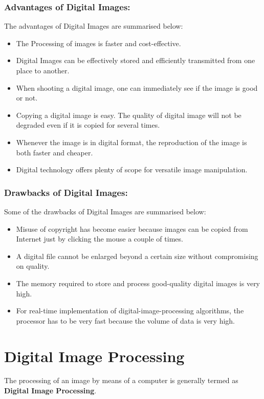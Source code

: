 \subsubsection{Advantages of Digital Images:}
The advantages of Digital Images are summarised below:
\begin{itemize}
    \item The Processing of images is faster and cost-effective.
    \item Digital Images can be effectively stored and efficiently transmitted from one place to another.
    \item When shooting a digital image, one can immediately see if the image is good or not.
    \item Copying a digital image is easy. The quality of digital image will not be degraded even if it is copied for several times.
    \item Whenever the image is in digital format, the reproduction of the image is both faster and cheaper.
    \item Digital technology offers plenty of scope for versatile image manipulation.
\end{itemize}

\subsubsection{Drawbacks of Digital Images:}
Some of the drawbacks of Digital Images are summarised below:
\begin{itemize}
    \item Misuse of copyright has become easier because images can be copied from Internet just by clicking the mouse a couple of times.
    \item A digital file cannot be enlarged beyond a certain size without compromising on quality.
    \item The memory required to store and process good-quality digital images is very high.
    \item For real-time implementation of digital-image-processing algorithms, the processor has to be very fast because the volume of data is very high.
\end{itemize}

\section{Digital Image Processing}

The processing of an image by means of a computer is generally termed as \textbf{Digital Image Processing}.

